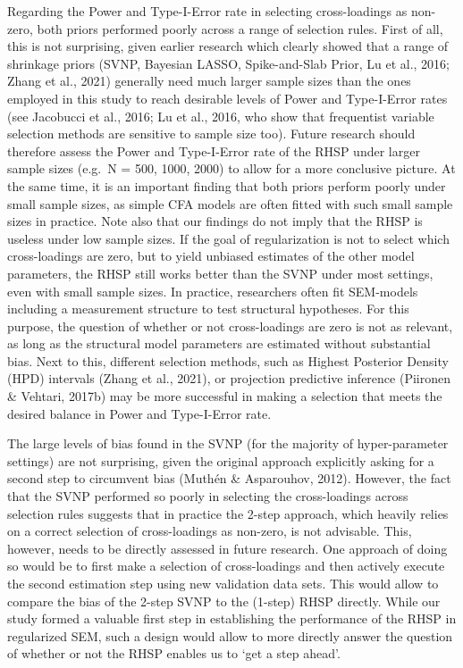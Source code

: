 \documentclass[
  man, donotrepeattitle,floatsintext]{apa6}
\begin{document}
Regarding the Power and Type-I-Error rate in selecting cross-loadings as non-zero, both priors performed poorly across a range of selection rules. First of all, this is not surprising, given earlier research which clearly showed that a range of shrinkage priors (SVNP, Bayesian LASSO, Spike-and-Slab Prior, Lu et al., 2016; Zhang et al., 2021) generally need much larger sample sizes than the ones employed in this study to reach desirable levels of Power and Type-I-Error rates (see Jacobucci et al., 2016; Lu et al., 2016, who show that frequentist variable selection methods are sensitive to sample size too). Future research should therefore assess the Power and Type-I-Error rate of the RHSP under larger sample sizes (e.g.~N = 500, 1000, 2000) to allow for a more conclusive picture. At the same time, it is an important finding that both priors perform poorly under small sample sizes, as simple CFA models are often fitted with such small sample sizes in practice. Note also that our findings do not imply that the RHSP is useless under low sample sizes. If the goal of regularization is not to select which cross-loadings are zero, but to yield unbiased estimates of the other model parameters, the RHSP still works better than the SVNP under most settings, even with small sample sizes. In practice, researchers often fit SEM-models including a measurement structure to test structural hypotheses. For this purpose, the question of whether or not cross-loadings are zero is not as relevant, as long as the structural model parameters are estimated without substantial bias. Next to this, different selection methods, such as Highest Posterior Density (HPD) intervals (Zhang et al., 2021), or projection predictive inference (Piironen \& Vehtari, 2017b) may be more successful in making a selection that meets the desired balance in Power and Type-I-Error rate.

The large levels of bias found in the SVNP (for the majority of hyper-parameter settings) are not surprising, given the original approach explicitly asking for a second step to circumvent bias (Muthén \& Asparouhov, 2012). However, the fact that the SVNP performed so poorly in selecting the cross-loadings across selection rules suggests that in practice the 2-step approach, which heavily relies on a correct selection of cross-loadings as non-zero, is not advisable. This, however, needs to be directly assessed in future research. One approach of doing so would be to first make a selection of cross-loadings and then actively execute the second estimation step using new validation data sets. This would allow to compare the bias of the 2-step SVNP to the (1-step) RHSP directly. While our study formed a valuable first step in establishing the performance of the RHSP in regularized SEM, such a design would allow to more directly answer the question of whether or not the RHSP enables us to `get a step ahead'.
\end{document}
